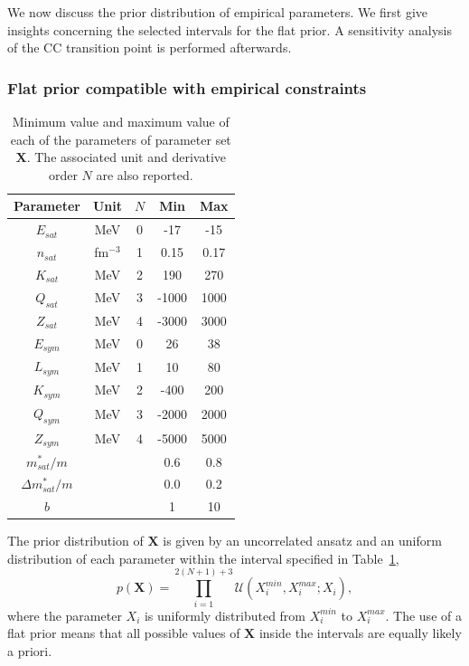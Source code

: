 We now discuss the prior distribution of empirical parameters. We first give 
insights concerning the selected intervals for the flat prior. A sensitivity 
analysis of the CC transition point is performed afterwards.

\subsubsection{Flat prior compatible with empirical constraints}\label{subsubsec:prior}

\begin{table}[!t]
  \begin{center}
    \begin{tabular}{ccccc} 
      \toprule
      \toprule
      Parameter & Unit & $N$ & Min & Max \\
      \midrule
      $E_{sat}$ & MeV & 0         & -17   & -15  \\
      $n_{sat}$ & fm$^{-3}$ & 1   & 0.15  & 0.17 \\ 
      $K_{sat}$ & MeV & 2         & 190   & 270  \\ 
      $Q_{sat}$ & MeV & 3         & -1000 & 1000 \\ 
      $Z_{sat}$ & MeV & 4         & -3000 & 3000 \\ 
      $E_{sym}$ & MeV & 0         & 26    & 38   \\
      $L_{sym}$ & MeV & 1         & 10    & 80   \\
      $K_{sym}$ & MeV & 2         & -400  & 200  \\
      $Q_{sym}$ & MeV & 3         & -2000 & 2000 \\
      $Z_{sym}$ & MeV & 4         & -5000 & 5000 \\
      $m_{sat}^*/m$ & &           & 0.6   & 0.8  \\
      $\Delta m_{sat}^*/m$ & &    & 0.0   & 0.2  \\
      $b$ & &                     & 1     & 10   \\
      \bottomrule
      \bottomrule
    \end{tabular}
  \end{center}
  \caption[Minimum value and maximum value of each of the empirical parameters
  for the prior distribution]{Minimum value and maximum value of each of the
    parameters of parameter set $\bm{X}$. The associated unit and derivative 
  order $N$ are also reported.}\label{table:prior}
\end{table}

The prior distribution of $\bm{X}$ is given by an uncorrelated ansatz and an
uniform distribution of each parameter within the interval specified in
Table~\ref{table:prior},
%
\begin{equation}
  p(\bm{X}) = \prod_{i=1}^{2(N+1)+3} \mathcal{U}(X_i^{min}, X_i^{max};X_i),
\end{equation}
%
where the parameter $X_i$ is uniformly distributed from $X_i^{min}$ to 
$X_i^{max}$. The use of a flat prior means that all possible values of 
$\bm{X}$ inside the intervals are equally likely a priori.

